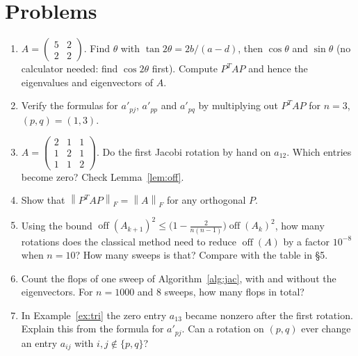 \documentclass[11pt,a4paper]{article}
\theoremstyle{definition}
\theoremstyle{remark}
\newcommand{\norm}[1]{\left\lVert #1\right\rVert}
\newcommand{\off}{\operatorname{off}}
\begin{document}
\section{Problems}
\begin{enumerate}
\item $A=\begin{pmatrix}5&2\\2&2\end{pmatrix}$. Find $\theta$ with $\tan2\theta=2b/(a-d)$, then $\cos\theta$ and $\sin\theta$
(no calculator needed: find $\cos2\theta$ first). Compute $P^TAP$ and hence the eigenvalues and eigenvectors of $A$.
\item Verify the formulas for $a'_{pj}$, $a'_{pp}$ and $a'_{pq}$ by multiplying out $P^TAP$ for $n=3$, $(p,q)=(1,3)$.
\item $A=\begin{pmatrix}2&1&1\\1&2&1\\1&1&2\end{pmatrix}$. Do the first Jacobi rotation by hand on $a_{12}$.
Which entries become zero? Check Lemma~\ref{lem:off}.
\item Show that $\norm{P^TAP}_F=\norm{A}_F$ for any orthogonal $P$.
\item Using the bound $\off(A_{k+1})^2\le\big(1-\frac{2}{n(n-1)}\big)\off(A_k)^2$, how many rotations does the classical method
need to reduce $\off(A)$ by a factor $10^{-8}$ when $n=10$? How many sweeps is that? Compare with the table in \S5.
\item Count the flops of one sweep of Algorithm~\ref{alg:jac}, with and without the eigenvectors. For $n=1000$ and 8 sweeps,
how many flops in total?
\item In Example~\ref{ex:tri} the zero entry $a_{13}$ became nonzero after the first rotation. Explain this from the formula for $a'_{pj}$.
Can a rotation on $(p,q)$ ever change an entry $a_{ij}$ with $i,j\notin\{p,q\}$?
\end{enumerate}
\end{document}
